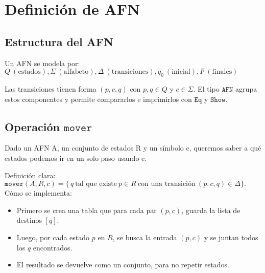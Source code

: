 \section{Definición de AFN}

\subsection{Estructura del AFN}
Un AFN se modela por:
$
Q\ (\text{estados}), \Sigma\ (\text{alfabeto}), \Delta\ (\text{transiciones}), q_0\ (\text{inicial}), F\ (\text{finales})
$

Las transiciones tienen forma $(p, c, q)$ con $p, q \in Q$ y $c \in \Sigma$. El tipo $\texttt{AFN}$ agrupa estos componentes y permite compararlos e imprimirlos con $\texttt{Eq}$ y $\texttt{Show}$.

\subsection{Operación $\texttt{mover}$}

Dado un AFN A, un conjunto de estados R y un símbolo c, queremos saber a qué estados podemos ir en un solo paso usando c.

Definición clara:
$
\texttt{mover}(A, R, c) = \{\, q \ \text{tal que existe}\ p \in R\ \text{con una transición}\ (p, c, q) \in \Delta \}.
$
Cómo se implementa:

\begin{itemize}
    \item Primero se crea una tabla que para cada par $(p, c)$, guarda la lista de destinos $[q]$.
    \item Luego, por cada estado $p$ en $R$, se busca la entrada $(p, c)$ y se juntan todos los $q$ encontrados.
    \item El resultado se devuelve como un conjunto, para no repetir estados.
\end{itemize}

